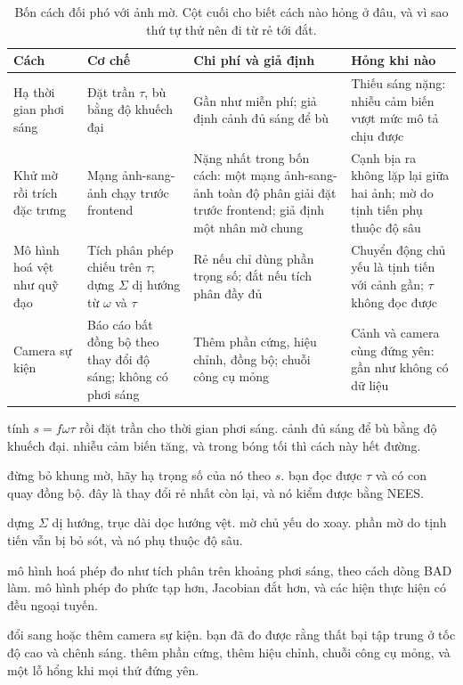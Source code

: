 \documentclass[../../deep_learning.tex]{subfiles}
\begin{document}
\begin{table}[H]\centering\footnotesize
\caption{Bốn cách đối phó với ảnh mờ. Cột cuối cho biết cách nào hỏng ở đâu, và vì sao thứ tự thử nên đi từ rẻ tới đắt.}
\label{tab:f34-mo}
\begin{tabularx}{\linewidth}{@{}L{2.7cm}L{3.4cm}YL{3.4cm}@{}}
\toprule
\textbf{Cách} & \textbf{Cơ chế} & \textbf{Chi phí và giả định} & \textbf{Hỏng khi nào}\\
\midrule
Hạ thời gian phơi sáng & Đặt trần \(\tau\), bù bằng độ khuếch đại & Gần như miễn phí; giả định cảnh đủ sáng để bù & Thiếu sáng nặng: nhiễu cảm biến vượt mức mô tả chịu được\\
Khử mờ rồi trích đặc trưng & Mạng ảnh-sang-ảnh chạy trước frontend & Nặng nhất trong bốn cách: một mạng ảnh-sang-ảnh toàn độ phân giải đặt trước frontend; giả định một nhân mờ chung & Cạnh bịa ra không lặp lại giữa hai ảnh; mờ do tịnh tiến phụ thuộc độ sâu\\
Mô hình hoá vệt như quỹ đạo & Tích phân phép chiếu trên \(\tau\); dựng \(\Sigma\) dị hướng từ \(\omega\) và \(\tau\) & Rẻ nếu chỉ dùng phần trọng số; đắt nếu tích phân đầy đủ & Chuyển động chủ yếu là tịnh tiến với cảnh gần; \(\tau\) không đọc được\\
Camera sự kiện & Báo cáo bất đồng bộ theo thay đổi độ sáng; không có phơi sáng & Thêm phần cứng, hiệu chỉnh, đồng bộ; chuỗi công cụ mỏng & Cảnh và camera cùng đứng yên: gần như không có dữ liệu\\
\bottomrule
\end{tabularx}
\end{table}

\begin{mach}
\item {} \gp tính \(s = f\omega\tau\) rồi đặt trần cho thời gian phơi sáng. \gd cảnh đủ sáng để bù bằng độ khuếch đại. \gia nhiễu cảm biến tăng, và trong bóng tối thì cách này hết đường.
\item {} \gp đừng bỏ khung mờ, hãy hạ trọng số của nó theo \(s\). \gd bạn đọc được \(\tau\) và có con quay đồng bộ. \hq đây là thay đổi rẻ nhất còn lại, và nó kiểm được bằng NEES.
\item {} \gp dựng \(\Sigma\) dị hướng, trục dài dọc hướng vệt. \gd mờ chủ yếu do xoay. \vdm phần mờ do tịnh tiến vẫn bị bỏ sót, và nó phụ thuộc độ sâu.
\item {} \gp mô hình hoá phép đo như tích phân trên khoảng phơi sáng, theo cách dòng BAD làm. \gia mô hình phép đo phức tạp hơn, Jacobian đắt hơn, và các hiện thực hiện có đều ngoại tuyến.
\item {} \gp đổi sang hoặc thêm camera sự kiện. \gd bạn đã đo được rằng thất bại tập trung ở tốc độ cao và chênh sáng. \gia thêm phần cứng, thêm hiệu chỉnh, chuỗi công cụ mỏng, và một lỗ hổng khi mọi thứ đứng yên.
\end{mach}
\end{document}
